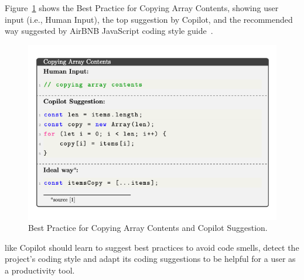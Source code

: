 Figure~\ref{fig:bp_1} shows the Best Practice for Copying Array Contents, showing user input (i.e., Human Input), the top suggestion by Copilot, and the recommended way suggested by AirBNB JavaScript coding style guide~\cite{airbnb_code}.

\begin{figure}[hbt!]
    \centering
    \includegraphics[width=\linewidth]{Figures/bp_1.png}
    \caption{Best Practice for Copying Array Contents and Copilot Suggestion.}
    \label{fig:bp_1}
\end{figure}

\cct{} like Copilot should learn to suggest best practices to avoid code smells, detect the project's coding style and adapt its coding suggestions to be helpful for a user as a productivity tool. 


